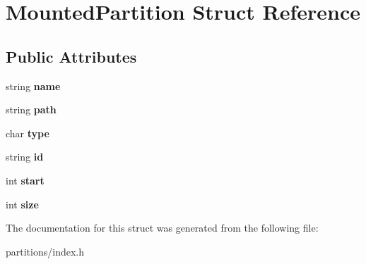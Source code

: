 \hypertarget{structMountedPartition}{}\section{Mounted\+Partition Struct Reference}
\label{structMountedPartition}
\subsection*{Public Attributes}
\begin{DoxyCompactItemize}
\item 
\mbox{\label{structMountedPartition_aab3bd309dbb4a176fa2f23c850fa68d9}} 
string {\bfseries name}
\item 
\mbox{\label{structMountedPartition_a3458bbf0240918c6b0fd247ee0c3405e}} 
string {\bfseries path}
\item 
\mbox{\label{structMountedPartition_a74a74c123c693156aad8b7a840aeac7c}} 
char {\bfseries type}
\item 
\mbox{\label{structMountedPartition_a88f48e09db3ebc627c09351ad525a5ab}} 
string {\bfseries id}
\item 
\mbox{\label{structMountedPartition_a5f05f2067502eef644a8b8076ccef89a}} 
int {\bfseries start}
\item 
\mbox{\label{structMountedPartition_ad462d68d54c5bbab2e1f2c6a0d0cfe07}} 
int {\bfseries size}
\end{DoxyCompactItemize}


The documentation for this struct was generated from the following file\+:\begin{DoxyCompactItemize}
\item 
partitions/index.\+h\end{DoxyCompactItemize}
